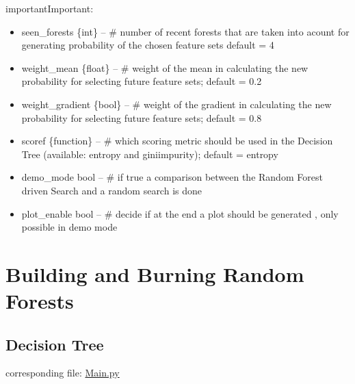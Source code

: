 \documentclass[letterpaper,10pt,english]{sphinxmanual}
\begin{document}
\begin{sphinxadmonition}{important}{Important:}
\begin{fulllineitems}
\begin{itemize}
\item {} 
seen\_forests \{int\} -- \# number of recent forests that are taken into acount for generating probability of the chosen feature sets default = 4

\item {} 
weight\_mean \{float\} -- \# weight of the mean in calculating the new probability for selecting future feature sets; default = 0.2

\item {} 
weight\_gradient \{bool\} -- \# weight of the gradient in calculating the new probability for selecting future feature sets; default = 0.8

\item {} 
scoref \{function\} -- \# which scoring metric should be used in the Decision Tree (available: entropy and giniimpurity); default = entropy

\item {} 
demo\_mode bool -- \# if true a comparison between the Random Forest driven Search and a random search is done

\item {} 
plot\_enable bool -- \# decide if at the end a plot should be generated , only possible in demo mode

\end{itemize}

\end{fulllineitems}

\end{sphinxadmonition}
\label{\detokenize{execution:blank}}\begin{figure}[htbp]
\centering

\noindent{}
\label{\detokenize{execution:blank}}\end{figure}


\chapter{Building and Burning Random Forests}
\label{\detokenize{index:building-and-burning-random-forests}}\label{\detokenize{index:loop}}

\section{Decision Tree}
\label{\detokenize{DT::doc}}\label{\detokenize{DT:decision-tree}}\label{\detokenize{DT:singletree}}
corresponding file: \href{https://github.com/weinertmos/ForestFire/blob/master/source/ForestFire/Main.py}{Main.py}
\end{document}

